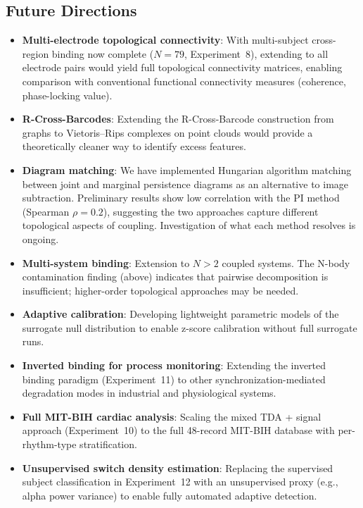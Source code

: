 \documentclass[11pt,a4paper]{article}
\begin{document}
\subsection{Future Directions}

\begin{itemize}
    \item \textbf{Multi-electrode topological connectivity}: With multi-subject cross-region binding now complete ($N = 79$, Experiment~8), extending to all electrode pairs would yield full topological connectivity matrices, enabling comparison with conventional functional connectivity measures (coherence, phase-locking value).
    \item \textbf{R-Cross-Barcodes}: Extending the R-Cross-Barcode construction from graphs to Vietoris--Rips complexes on point clouds would provide a theoretically cleaner way to identify excess features.
    \item \textbf{Diagram matching}: We have implemented Hungarian algorithm matching between joint and marginal persistence diagrams as an alternative to image subtraction. Preliminary results show low correlation with the PI method (Spearman $\rho = 0.2$), suggesting the two approaches capture different topological aspects of coupling. Investigation of what each method resolves is ongoing.
    \item \textbf{Multi-system binding}: Extension to $N > 2$ coupled systems. The N-body contamination finding (above) indicates that pairwise decomposition is insufficient; higher-order topological approaches may be needed.
    \item \textbf{Adaptive calibration}: Developing lightweight parametric models of the surrogate null distribution to enable z-score calibration without full surrogate runs.
    \item \textbf{Inverted binding for process monitoring}: Extending the inverted binding paradigm (Experiment~11) to other synchronization-mediated degradation modes in industrial and physiological systems.
    \item \textbf{Full MIT-BIH cardiac analysis}: Scaling the mixed TDA + signal approach (Experiment~10) to the full 48-record MIT-BIH database with per-rhythm-type stratification.
    \item \textbf{Unsupervised switch density estimation}: Replacing the supervised subject classification in Experiment~12 with an unsupervised proxy (e.g., alpha power variance) to enable fully automated adaptive detection.
\end{itemize}
\end{document}
